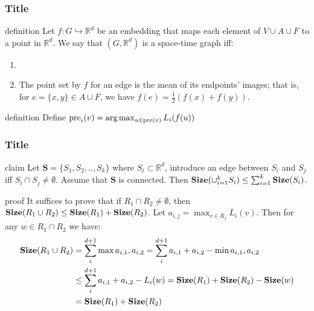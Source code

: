 \documentclass{beamer}
\begin{document}
\begin{frame}
  \frametitle{Title} 
  \begin{block}{definition}
Let $f : G \hookrightarrow \mathbb{R}^{d}$ be an embedding that maps each element of $V \cup A \cup F$ to a point in $\mathbb{R}^{d}$. We say that $\left( G, \mathbb{R}^{d} \right) $ is a space-time graph iff: 
\begin{enumerate}
  \item \item The point set by $f$ for an edge is the mean of its endpoints' images; that is, for $e = \{x,y\} \in A \cup F$, we have $f(e) = \frac{1}{2}\left(f(x) + f(y)\right)$.
\end{enumerate}
  \end{block}

  \begin{block}{definition}
    Define $\text{pre}_{i}(v) = \arg\max_{u \in \text{pre}(v)}L_{i}(f(u))$
  \end{block}

\end{frame}
\begin{frame}
  \frametitle{Title} 

  \begin{block}{claim}
    Let $\mathbf{S} = \{ S_{1}, S_{2} , .. , S_{k} \}$ where $S_{i} \subset \mathbb{R}^{d}$, introduce an edge between $S_{i}$ and $S_{j}$ iff $S_{i} \cap S_{j} \neq \emptyset$. Assume that $\mathbf{S}$ is connected. Then $\mathbf{Size}(\cup^{k}_{i=1} S_{i}) \le \sum^{k}_{i=1}{\mathbf{Size}(S_{i})}$. 
  \end{block}
  \begin{block}{proof}
    It suffices to prove that if $R_{1} \cap R_{2} \neq \emptyset$, then $\mathbf{Size}(R_{1} \cup R_{2}) \le \mathbf{Size}(R_{1}) + \mathbf{Size}(R_{2})$. Let $a_{i,j} = \max_{v \in R_{j}}L_{i}(v)$. Then for any $w \in R_{1}\cap R_{2}$ we have:  
    \begin{equation*}
      \begin{split}
        \mathbf{Size}(R_{1} \cup R_{2}) &= \sum_{i}^{d+1}{\max{ a_{i,1},a_{i,2} } } =  \sum_{i}^{d+1}{a_{i,1} + a_{i,2} - \min{ a_{i,1},a_{i,2} } } \\
        & \le   \sum_{i}^{d+1}{a_{i,1} + a_{i,2} - L_{i}(w) } = \mathbf{Size}(R_{1}) + \mathbf{Size}(R_{2}) - \mathbf{Size}(w)  \\
        &  = \mathbf{Size}(R_{1}) + \mathbf{Size}(R_{2}) 
      \end{split}
    \end{equation*}
  \end{block}
\end{frame}
\end{document}
